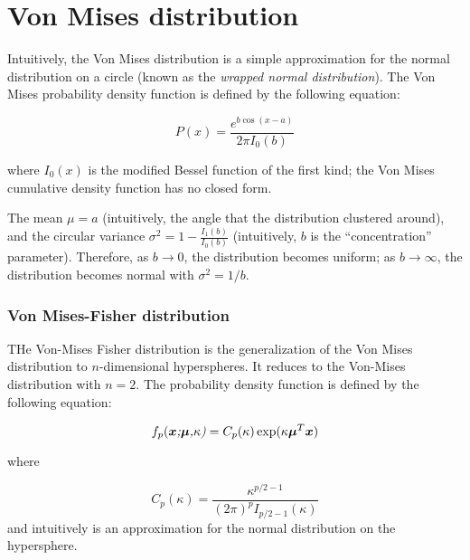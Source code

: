 \documentclass[../tech_report_1.tex]{subfiles}
\begin{document}
\part*{Von Mises distribution}

Intuitively, the Von Mises distribution\cite{wolfram_von_mises} is
a simple approximation for the normal distribution on a circle (known
as the \textit{wrapped normal distribution}). The Von Mises probability
density function is defined by the following equation:

\[
P(x)=\frac{{e^{b\cos(x-a)}}}{2\pi I_{0}(b)}
\]


where $I_{0}(x)$ is the modified Bessel function of the first kind;
the Von Mises cumulative density function has no closed form.

The mean $\mu=a$ (intuitively, the angle that the distribution clustered
around), and the circular variance $\sigma^{2}=1-\frac{{I_{1}(b)}}{I_{0}(b)}$
(intuitively, $b$ is the ``concentration'' parameter). Therefore,
as $b\rightarrow0$, the distribution becomes uniform; as $b\rightarrow\infty$,
the distribution becomes normal with $\sigma^{2}=1/b$.


\section*{Von Mises-Fisher distribution}

THe Von-Mises Fisher distribution is the generalization of the Von
Mises distribution to $n$-dimensional hyperspheres. It reduces to
the Von-Mises distribution with $n=2$. The probability density function
is defined by the following equation:

\[
f_{p}(\emph{\ensuremath{\boldsymbol{x}};\ensuremath{\boldsymbol{\mu}},\ensuremath{\kappa})}=C_{p}(\kappa)\exp(\kappa\boldsymbol{\mu}^{T}\boldsymbol{x})
\]


where

\[
C_{p}(\kappa)=\frac{\kappa^{p/2-1}}{(2\pi)^{p}I_{p/2-1}(\kappa)}
\]
 and intuitively is an approximation for the normal distribution on
the hypersphere.
\end{document}
